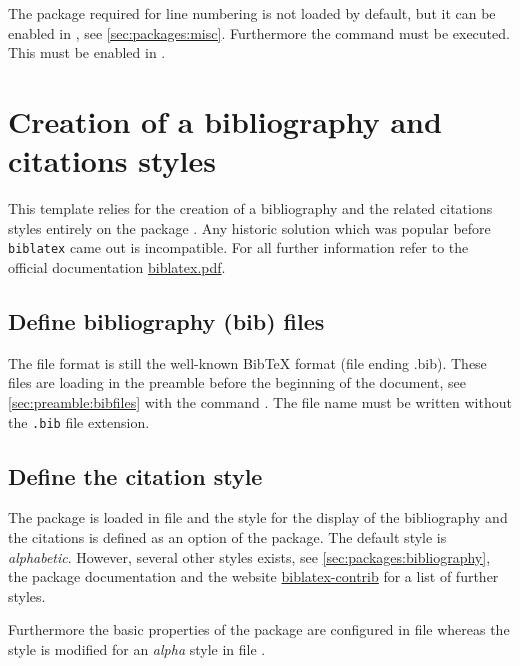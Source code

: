 The package required for line numbering is not loaded by default, but it can be enabled in , see \cref{sec:packages:misc}. Furthermore the command  must be executed. This must be enabled in .

\section{Creation of a bibliography and citations styles}
\label{sec:doc:faq:biblatex}

This template relies for the creation of a bibliography and the related citations styles entirely on the package . Any historic solution which was popular before \texttt{biblatex} came out is incompatible.
For all further information refer to the official documentation \href{http://mirrors.ctan.org/macros/latex/contrib/biblatex/doc/biblatex.pdf}{biblatex.pdf}.

\subsection{Define bibliography (bib) files}
The file format is still the well-known BibTeX format (file ending .bib). These files are loading in the preamble before the beginning of the document, see \cref{sec:preamble:bibfiles} with the command . The file name must be written without the \texttt{.bib} file extension.

\subsection{Define the citation style}
The package is loaded in file  and the style for the display of the bibliography and the citations is defined as an option of the package. The default style is \emph{alphabetic}. However, several other styles exists, see \cref{sec:packages:bibliography}, the package documentation and the website \href{http://www.ctan.org/tex-archive/macros/latex/exptl/biblatex-contrib}{biblatex-contrib} for a list of further styles. 

Furthermore the basic properties of the package are configured in file  whereas the style is modified for an \emph{alpha} style in file .

